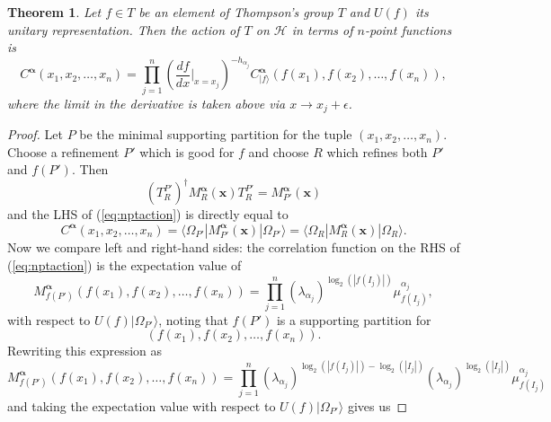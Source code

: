 \documentclass[11pt,oneside]{amsart}
\theoremstyle{plain}%
\newtheorem{theorem}{Theorem}[section]
\theoremstyle{definition}
\theoremstyle{remark}
\begin{document}
\begin{theorem}\label{thm:npointaction}
Let $f\in T$ be an element of Thompson's group $T$ and $U(f)$ its unitary representation. Then the action of $T$ on $\mathcal{H}$ in terms of $n$-point functions is
	\begin{equation}\label{eq:nptaction}
		C^{\boldsymbol{\alpha}}(x_1, x_2, \ldots, x_n) = \prod_{j=1}^n \left(\frac{df}{dx}\bigg|_{x = x_j}\right)^{-h_{\alpha_j}}C^{\boldsymbol{\alpha}}_{|f\rangle}(f(x_1), f(x_2), \ldots, f(x_n)),
	\end{equation}
	where the limit in the derivative is taken above via $x\rightarrow x_j+\epsilon$.
\end{theorem}
\begin{proof}
	Let $P$ be the minimal supporting partition for the tuple $(x_1, x_2, \ldots, x_n)$. Choose a refinement $P'$ which is good for $f$ and choose $R$ which refines both $P'$ and $f(P')$. Then
	\begin{equation}
		(T^{P'}_R)^\dag M^{\boldsymbol{\alpha}}_{R}(\mathbf{x})T^{P'}_R = M^{\boldsymbol{\alpha}}_{P'}(\mathbf{x})
	\end{equation}
	and the LHS of (\ref{eq:nptaction}) is directly equal to
	\begin{equation}
		C^{\boldsymbol{\alpha}}(x_1, x_2, \ldots, x_n) = \langle\Omega_{P'}| M^{\boldsymbol{\alpha}}_{P'}(\mathbf{x}) | \Omega_{P'}\rangle = \langle\Omega_{R}| M^{\boldsymbol{\alpha}}_{R}(\mathbf{x}) | \Omega_{R}\rangle.
	\end{equation}
	Now we compare left and right-hand sides: the correlation function on the RHS of (\ref{eq:nptaction}) is the expectation value of
	\begin{equation}
		M^{\boldsymbol{\alpha}}_{f(P')}(f(x_1), f(x_2), \ldots, f(x_n)) = \prod_{j=1}^n (\lambda_{\alpha_j})^{\log_2(|f(I_j)|)}\mu_{f(I_j)}^{\alpha_j},
	\end{equation}
	with respect to $U(f)|\Omega_{P'}\rangle$, noting that $f(P')$ is a supporting partition for
	\begin{equation}
		(f(x_1), f(x_2), \ldots, f(x_n)).
	\end{equation}
	Rewriting this expression as
	\begin{equation}
		M^{\boldsymbol{\alpha}}_{f(P')}(f(x_1), f(x_2), \ldots, f(x_n)) = \prod_{j=1}^n (\lambda_{\alpha_j})^{\log_2(|f(I_j)|)-\log_2(|I_j|)}(\lambda_{\alpha_j})^{\log_2(|I_j|)}\mu_{f(I_j)}^{\alpha_j}
	\end{equation}
	and taking the expectation value with respect to $U(f)|\Omega_{P'}\rangle$ gives us

\end{proof}
\end{document}
